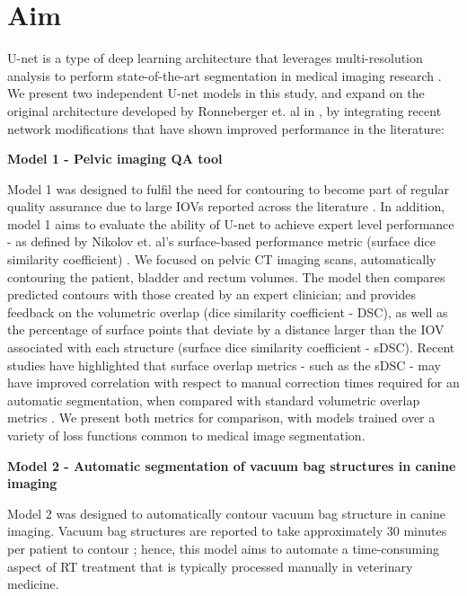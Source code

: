 \section{Aim}

U-net is a type of deep learning architecture that leverages multi-resolution analysis to perform state-of-the-art segmentation in medical imaging research \cite{Kazemifar_2018, Zhu_2018}. We present two independent U-net models in this study, and expand on the original architecture developed by Ronneberger et. al in \cite{Ronneberger_2015}, by integrating recent network modifications that have shown improved performance in the literature: 

\textbf{Model 1 - Pelvic imaging QA tool}

Model 1 was designed to fulfil the need for contouring to become part of regular quality assurance due to large IOVs reported across the literature \cite{Vinod_2016}. In addition, model 1 aims to evaluate the ability of U-net to achieve expert level performance - as defined by Nikolov et. al's surface-based performance metric (surface dice similarity coefficient) \cite{Nikolov_2018}. We focused on pelvic CT imaging scans, automatically contouring the patient, bladder and rectum volumes. The model then compares predicted contours with those created by an expert clinician; and provides feedback on the volumetric overlap (dice similarity coefficient - DSC), as well as the percentage of surface points that deviate by a distance larger than the IOV associated with each structure (surface dice similarity coefficient - sDSC). Recent studies have highlighted that surface overlap metrics - such as the sDSC - may have improved correlation with respect to manual correction times required for an automatic segmentation, when compared with standard volumetric overlap metrics \cite{Vaassen_2020}. We present both metrics for comparison, with models trained over a variety of loss functions common to medical image segmentation.

\textbf{Model 2 - Automatic segmentation of vacuum bag structures in canine imaging}

Model 2 was designed to automatically contour vacuum bag structure in canine imaging. Vacuum bag structures are reported to take approximately 30 minutes per patient to contour \cite{CITATION}; hence, this model aims to automate a time-consuming aspect of RT treatment that is typically processed manually in veterinary medicine.


